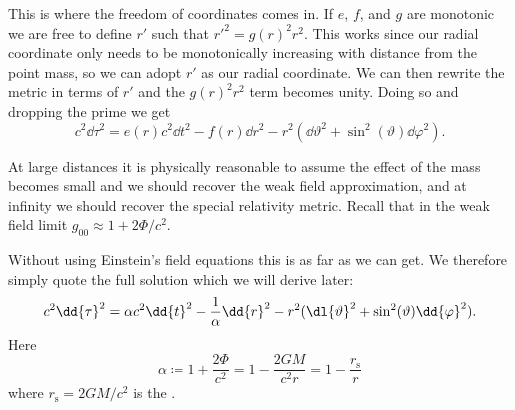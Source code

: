 \documentclass[fleqn]{NotesClass}
\begin{document}
    This is where the freedom of coordinates comes in.
    If \(e\), \(f\), and \(g\) are monotonic we are free to define \(r'\) such that \(r'^2 = g(r)^2r^2\).
    This works since our radial coordinate only needs to be monotonically increasing with distance from the point mass, so we can adopt \(r'\) as our radial coordinate.
    We can then rewrite the metric in terms of \(r'\) and the \(g(r)^2r^2\) term becomes unity.
    Doing so and dropping the prime we get
    \begin{equation}
        c^2\dd{\tau}^2 = e(r)c^2\dd{t}^2 - f(r)\dd{r}^2 - r^2(\dd{\vartheta}^2 + \sin^2(\vartheta) \dd{\varphi}^2).
    \end{equation}
    
    At large distances it is physically reasonable to assume the effect of the mass becomes small and we should recover the weak field approximation, and at infinity we should recover the special relativity metric.
    Recall that in the weak field limit \(g_{00} \approx 1 + 2\Phi/c^2\).
    
    Without using Einstein's field equations this is as far as we can get.
    We therefore simply quote the full solution which we will derive later:
    \begin{equation}
        c^2\dd{\tau}^2 = \alpha c^2\dd{t}^2 - \frac{1}{\alpha}\dd{r}^2 - r^2(\dl{\vartheta}^2 + \sin^2(\vartheta) \dd{\varphi}^2).
    \end{equation}
    Here
    \begin{equation}
        \alpha \coloneqq 1 + \frac{2\Phi}{c^2} = 1 - \frac{2GM}{c^2r} = 1 - \frac{r_{\mathrm{s}}}{r}
    \end{equation}
    where \(r_{\mathrm{s}} = 2GM/c^2\) is the .
    
\end{document}
